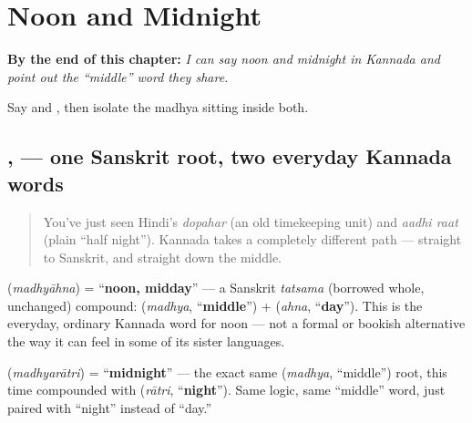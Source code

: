 
\chapter{Noon and Midnight}
\label{ch:ka-noon-and-midnight}

\begin{chapteropening}
\textbf{By the end of this chapter:} \emph{I can say noon and midnight in Kannada and point out the \textquotedblleft{}middle\textquotedblright{} word they share.}

Say  and , then isolate the madhya sitting inside both.
\end{chapteropening}

\section[\texorpdfstring{\kn{ಮಧ್ಯಾಹ್ನ} \kn{ಮಧ್ಯರಾತ್ರಿ} (madhyāhna madhyarātri)}{ಮಧ್ಯಾಹ್ನ ಮಧ್ಯರಾತ್ರಿ (madhyāhna madhyarātri)}]{,  — one Sanskrit root, two everyday Kannada words}

\label{lesson:KA-C17-madhyaahna-madhyaraatri}



\begin{quote}
You've just seen Hindi's \emph{dopahar} (an old timekeeping unit) and \emph{aadhi raat} (plain \textquotedblleft{}half night\textquotedblright{}). Kannada takes a completely different path — straight to Sanskrit, and straight down the middle.
\end{quote}

\begin{cousinweb}
\textbf{} (\emph{madhyāhna}) = \textquotedblleft{}\textbf{noon, midday}\textquotedblright{} — a Sanskrit \emph{tatsama} (borrowed whole, unchanged) compound: \textbf{} (\emph{madhya}, \textquotedblleft{}\textbf{middle}\textquotedblright{}) + \textbf{} (\emph{ahna}, \textquotedblleft{}\textbf{day}\textquotedblright{}). This is the everyday, ordinary Kannada word for noon — not a formal or bookish alternative the way it can feel in some of its sister languages.
\end{cousinweb}

\begin{cousinweb}
\textbf{} (\emph{madhyarātri}) = \textquotedblleft{}\textbf{midnight}\textquotedblright{} — the exact same \textbf{} (\emph{madhya}, \textquotedblleft{}middle\textquotedblright{}) root, this time compounded with \textbf{} (\emph{rātri}, \textquotedblleft{}\textbf{night}\textquotedblright{}). Same logic, same \textquotedblleft{}middle\textquotedblright{} word, just paired with \textquotedblleft{}night\textquotedblright{} instead of \textquotedblleft{}day.\textquotedblright{}
\end{cousinweb}

